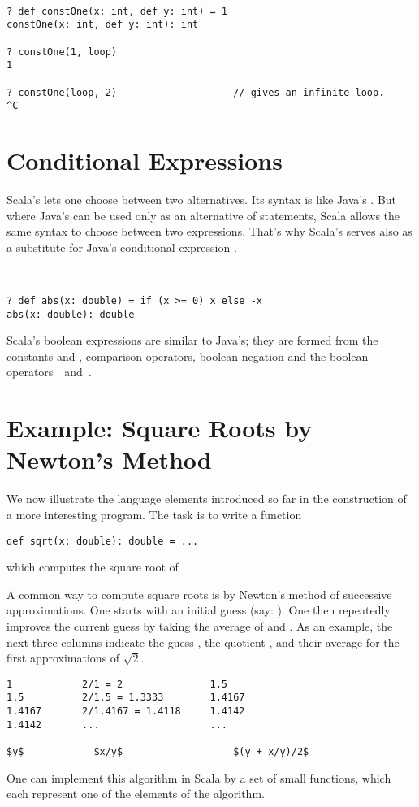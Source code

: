 \documentclass[a4paper,12pt,twoside,titlepage]{book}
\begin{document}
\example\ 
 
\begin{lstlisting}
? def constOne(x: int, def y: int) = 1
constOne(x: int, def y: int): int

? constOne(1, loop)
1

? constOne(loop, 2)                    // gives an infinite loop.
^C
\end{lstlisting}

\section{Conditional Expressions}

Scala's  lets one choose between two alternatives.  Its
syntax is like Java's . But where Java's 
can be used only as an alternative of statements, Scala allows the
same syntax to choose between two expressions. That's why Scala's
 serves also as a substitute for Java's conditional
expression .

\example\ 

\begin{lstlisting}
? def abs(x: double) = if (x >= 0) x else -x
abs(x: double): double
\end{lstlisting}
Scala's boolean expressions are similar to Java's; they are formed
from the constants
 and
, comparison operators, boolean negation \code{!} and the
boolean operators $\,$\code{&&}$\,$ and $\,$\code{||}.

\section{\label{sec:sqrt}Example: Square Roots by Newton's Method}

We now illustrate the language elements introduced so far in the
construction of a more interesting program. The task is to write a
function
\begin{lstlisting}
def sqrt(x: double): double = ... 
\end{lstlisting}
which computes the square root of .

A common way to compute square roots is by Newton's method of
successive approximations. One starts with an initial guess 
(say: ). One then repeatedly improves the current guess
 by taking the average of  and .  As an
example, the next three columns indicate the guess , the
quotient , and their average for the first approximations of
$\sqrt 2$.
\begin{lstlisting}
1            2/1 = 2               1.5
1.5          2/1.5 = 1.3333        1.4167
1.4167       2/1.4167 = 1.4118     1.4142
1.4142       ...                   ...

$y$            $x/y$                   $(y + x/y)/2$
\end{lstlisting}
One can implement this algorithm in Scala by a set of small functions,
which each represent one of the elements of the algorithm.  
\end{document}
